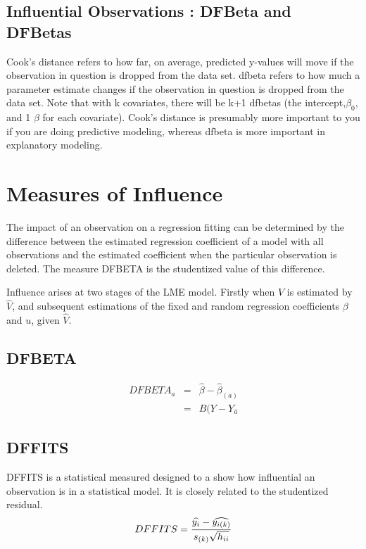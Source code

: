 \documentclass[12pt, a4paper]{report}
\begin{document}
\subsection{Influential Observations : DFBeta and DFBetas}
Cook's distance refers to how far, on average, predicted y-values will move if the observation in question is dropped from the data set. dfbeta refers to how much a parameter estimate changes if the observation in question is dropped from the data set. Note that with k covariates, there will be k+1 dfbetas (the intercept,$\beta_0$, and 1 $\beta$ for each covariate). Cook's distance is presumably more important to you if you are doing predictive modeling, whereas dfbeta is more important in explanatory modeling.



\section{Measures of Influence} %

The impact of an observation on a regression fitting can be determined by the difference between the estimated regression coefficient of a model with all observations and the estimated coefficient when the particular observation is deleted. The measure DFBETA is the studentized value of this difference.

Influence arises at two stages of the LME model. Firstly when $V$ is estimated by $\hat{V}$, and subsequent
estimations of the fixed and random regression coefficients $\beta$ and $u$, given $\hat{V}$.


\subsection{DFBETA} %
\begin{eqnarray}
DFBETA_{a} &=& \hat{\beta} - \hat{\beta}_{(a)} \\
&=& B(Y-Y_{\bar{a}}
\end{eqnarray}

\subsection{DFFITS} %
DFFITS is a statistical measured designed to a show how influential an observation is in a statistical model. It is closely related to the studentized residual.
\begin{displaymath} DFFITS = {\widehat{y_i} -
	\widehat{y_{i(k)}} \over s_{(k)} \sqrt{h_{ii}}} \end{displaymath}
\end{document}

